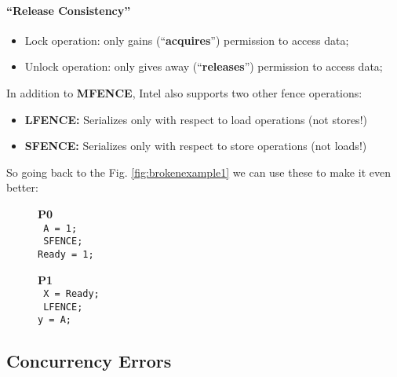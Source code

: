 \paragraph{\enquote{Release Consistency}}
\begin{itemize}
    \item Lock operation: only gains (\enquote{\textbf{acquires}}) permission to access data;
    \item Unlock operation: only gives away (\enquote{\textbf{releases}}) permission to access data;
\end{itemize}
\par In addition to \textbf{MFENCE}, Intel also supports two other fence operations:
\begin{itemize}
    \item \textbf{LFENCE:} Serializes only with respect to load operations (not stores!)
    \item \textbf{SFENCE:} Serializes only with respect to store operations (not loads!)
\end{itemize}
\par So going back to the Fig. \ref{fig:brokenexample1} we can use these to make it even better:
\begin{figure}[h]
    \begin{minipage}[t]{0.5\textwidth}
        \begin{center}
            \textbf{P0}\\
            \texttt{
            A = 1;\\
            {\color{green} SFENCE};\\
            Ready = 1;
            }
        \end{center}
    \end{minipage}
    \begin{minipage}[t]{0.5\textwidth}
        \begin{center}
            \textbf{P1}\\
            \bigskip
            \texttt{
            X = Ready;\\
            {\color{green} LFENCE};\\
            y = A;
            }
        \end{center}
    \end{minipage}
    \caption{}
    \label{fig:brokenexample2}
\end{figure}
%
%
\subsection{Concurrency Errors}
\par 
